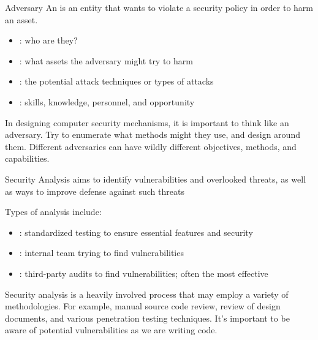 \documentclass[12pt]{report}
\begin{document}
\begin{dfnbox}{Adversary}{}
    An  is an entity that wants to violate a security policy in order to harm an asset.
    \begin{itemize}[noitemsep]
        \item {}: who are they?
        \item {}: what assets the adversary might try to harm
        \item {}: the potential attack techniques or types of attacks
        \item {}: skills, knowledge, personnel, and opportunity
    \end{itemize}
\end{dfnbox}

In designing computer security mechanisms, it is important to think like an adversary. Try to enumerate what methods might they use, and design around them. Different adversaries can have wildly different objectives, methods, and capabilities.

\begin{dfnbox}{Security Analysis}{}
     aims to identify vulnerabilities and overlooked threats, as well as ways to improve defense against such threats
\end{dfnbox}

Types of analysis include:
\begin{itemize}[noitemsep]
    \item {}: standardized testing to ensure essential features and security
    \item {}: internal team trying to find vulnerabilities
    \item {}: third-party audits to find vulnerabilities; often the most effective
\end{itemize}

Security analysis is a heavily involved process that may employ a variety of methodologies. For example, manual source code review, review of design documents, and various penetration testing techniques. It's important to be aware of potential vulnerabilities as we are writing code.
\end{document}
